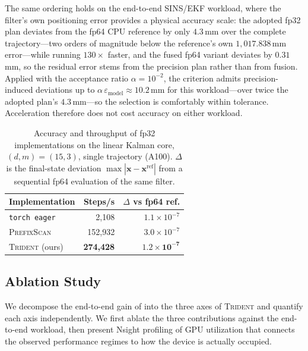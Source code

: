The same ordering holds on the end-to-end SINS/EKF workload, where the filter's own positioning error provides a physical accuracy scale: the adopted fp32 plan deviates from the fp64 CPU reference by only $4.3$\,mm over the complete trajectory---two orders of magnitude below the reference's own $1{,}017.838$\,mm error---while running $130\times$ faster, and the fused fp64 variant deviates by $0.31$\,mm, so the residual error stems from the precision plan rather than from fusion. Applied with the acceptance ratio $\alpha{=}10^{-2}$, the criterion  admits precision-induced deviations up to $\alpha\,\varepsilon_{\mathrm{model}}\approx10.2$\,mm for this workload---over twice the adopted plan's $4.3$\,mm---so the selection is comfortably within tolerance. Acceleration therefore does not cost accuracy on either workload.

\begin{table}[!t]
  \centering
  \caption{Accuracy and throughput of fp32 implementations on the linear Kalman core, $(d,m)=(15,3)$, single trajectory (A100). $\Delta$ is the final-state deviation $\max|\mathbf{x}-\mathbf{x}^{\mathrm{ref}}|$ from a sequential fp64 evaluation of the same filter.}
  \label{tab:precision-fidelity}
  \begin{tabular}{@{}lrr@{}}
    \toprule
    Implementation & Steps/s & $\Delta$ vs fp64 ref. \\
    \midrule
    \texttt{torch eager} & 2,108 & $1.1\times10^{-7}$ \\
    \textsc{PrefixScan} & 152,932 & $3.0\times10^{-7}$ \\
    \textsc{Trident} (ours) & \textbf{274,428} & $\mathbf{1.2\times10^{-7}}$ \\
    \bottomrule
  \end{tabular}
\end{table}

\subsection{Ablation Study}
\label{subsec:ablation}

We decompose the end-to-end gain of  into the three axes of \textsc{Trident} and quantify each axis independently. We first ablate the three contributions against the end-to-end workload, then present Nsight profiling of GPU utilization that connects the observed performance regimes to how the device is actually occupied.

